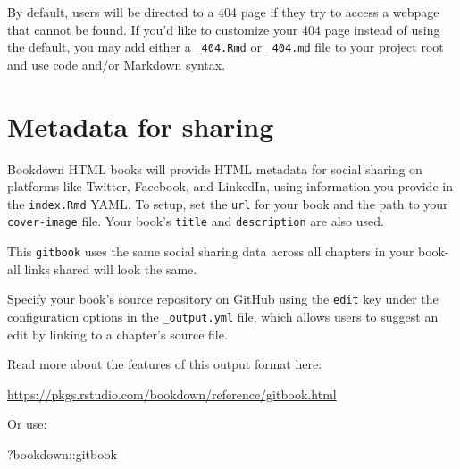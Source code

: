 \documentclass[
]{book}
\newenvironment{Shaded}{\begin{snugshade}}{\end{snugshade}}
\newcommand{\NormalTok}[1]{#1}
\newcommand{\SpecialCharTok}[1]{\textcolor[rgb]{0.00,0.00,0.00}{#1}}
\begin{document}
By default, users will be directed to a 404 page if they try to access a webpage that cannot be found. If you'd like to customize your 404 page instead of using the default, you may add either a \texttt{\_404.Rmd} or \texttt{\_404.md} file to your project root and use code and/or Markdown syntax.

\hypertarget{metadata-for-sharing}{%
\section{Metadata for sharing}\label{metadata-for-sharing}}

Bookdown HTML books will provide HTML metadata for social sharing on platforms like Twitter, Facebook, and LinkedIn, using information you provide in the \texttt{index.Rmd} YAML. To setup, set the \texttt{url} for your book and the path to your \texttt{cover-image} file. Your book's \texttt{title} and \texttt{description} are also used.

This \texttt{gitbook} uses the same social sharing data across all chapters in your book- all links shared will look the same.

Specify your book's source repository on GitHub using the \texttt{edit} key under the configuration options in the \texttt{\_output.yml} file, which allows users to suggest an edit by linking to a chapter's source file.

Read more about the features of this output format here:

\url{https://pkgs.rstudio.com/bookdown/reference/gitbook.html}

Or use:

\begin{Shaded}
\begin{Highlighting}[]
\NormalTok{?bookdown}\SpecialCharTok{::}\NormalTok{gitbook}
\end{Highlighting}
\end{Shaded}


  
\end{document}
